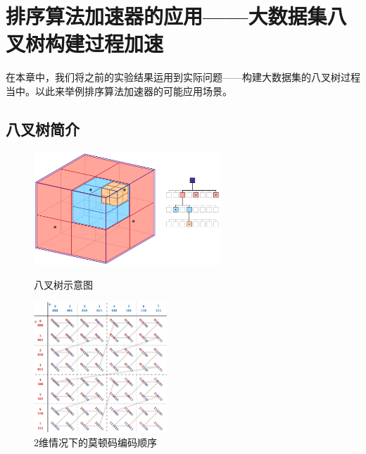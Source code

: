 
\chapter{排序算法加速器的应用——大数据集八叉树构建过程加速}

在本章中，我们将之前的实验结果运用到实际问题——构建大数据集的八叉树过程当中。以此来举例排序算法加速器的可能应用场景。

\section{八叉树简介}


\begin{figure}[htbp]
\centering
\begin{minipage}[t]{0.48\textwidth}
\centering
\includegraphics[width=7cm]{figures/octree.png}
\caption{八叉树示意图}
\label{fig:octree}
\end{minipage}
\begin{minipage}[t]{0.38\textwidth}
\centering
\includegraphics[width=5cm]{figures/Z-curve45.pdf}
\caption{2维情况下的莫顿码编码顺序}
\label{fig:morton_code}
\end{minipage}
\end{figure}



